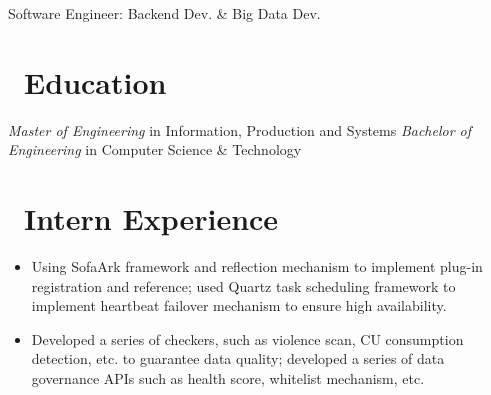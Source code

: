 \documentclass{resume}
\begin{document}


\vspace{-0.5ex}
\centerline{Software Engineer: Backend Dev. \& Big Data Dev.}
\vspace{1ex}
\vspace{-1.5ex}
 
\section{\faGraduationCap\ Education}
\vspace{-0.5ex}
\vspace{-0.5ex}
\textit{Master of Engineering} in Information, Production and Systems
\vspace{-1ex}
\vspace{-0.5ex}
\textit{Bachelor of Engineering} in Computer Science \& Technology
\vspace{-0.6ex}

\section{\faSitemap\ Intern Experience}
\vspace{-0.5ex}
\begin{itemize}
  \item Using SofaArk framework and reflection mechanism to implement plug-in registration and reference; used Quartz task scheduling framework to implement heartbeat failover mechanism to ensure high availability.
  \item Developed a series of checkers, such as violence scan, CU consumption detection, etc. to guarantee data quality; developed a series of data governance APIs such as health score, whitelist mechanism, etc.
\end{itemize}
\vspace{-2.5ex}
\end{document}
